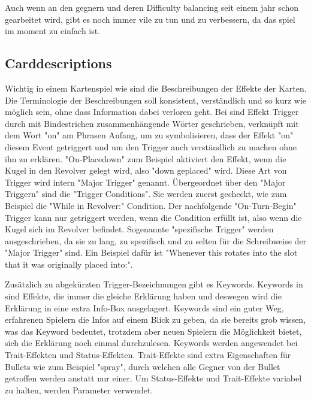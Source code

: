 Auch wenn an den gegnern und deren Difficulty balancing seit einem jahr schon gearbeitet wird, gibt es noch immer vile
zu tun und zu verbessern, da das spiel im moment zu einfach ist.






\subsection{Carddescriptions}\label{subsec:placementMatters}

Wichtig in einem Kartenspiel wie \FF sind die Beschreibungen der Effekte der Karten. Die Terminologie der Beschreibungen
soll konsistent, verständlich und so kurz wie möglich sein, ohne dass Information dabei verloren geht. Bei \FF sind
Effekt Trigger durch mit Bindestrichen zusammenhängende Wörter geschrieben, verknüpft mit dem Wort "on" am Phrasen Anfang, um zu symbolisieren,
dass der Effekt "on" diesem Event getriggert und um den Trigger auch verständlich zu machen ohne ihn zu erklären.
"On-Placedown" zum Beispiel aktiviert den Effekt, wenn die Kugel in den Revolver gelegt wird, also "down geplaced" wird.
Diese Art von Trigger wird intern "Major Trigger" genannt.
Übergeordnet über den "Major Triggern" sind die "Trigger Conditions". Sie werden zuerst gecheckt, wie zum Beispiel die "While in Revolver:" Condition.
Der nachfolgende "On-Turn-Begin" Trigger kann nur getriggert werden, wenn die Condition erfüllt ist, also wenn die Kugel sich im Revolver befindet. %
Sogenannte "spezifische Trigger" werden ausgeschrieben, da sie zu lang, zu spezifisch und zu selten für die Schreibweise der "Major Trigger" sind. Ein Beispiel dafür ist
"Whenever this rotates into the slot that it was originally placed into:".


Zusätzlich zu abgekürzten Trigger-Bezeichnungen gibt es Keywords. Keywords in \FF sind Effekte, die immer die gleiche
Erklärung haben und deswegen wird die Erklärung in eine extra Info-Box ausgelagert. %
Keywords sind ein guter Weg, erfahrenen Spielern die Infos auf einem Blick zu geben, da sie bereits grob wissen, was das
Keyword bedeutet, trotzdem aber neuen Spielern die Möglichkeit bietet, sich die Erklärung noch einmal durchzulesen.
Keywords werden angewendet bei Trait-Effekten und Status-Effekten. Trait-Effekte sind extra Eigenschaften für Bullets
wie zum Beispiel "spray", durch welchen alle Gegner von der Bullet getroffen werden anstatt nur einer.
Um Status-Effekte und Trait-Effekte variabel zu halten, werden Parameter verwendet. %



